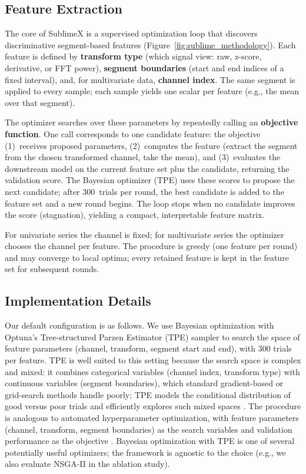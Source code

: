 \documentclass[times, review, 10pt]{elsarticle}
\begin{document}
\subsection{Feature Extraction}
The core of SublimeX is a supervised optimization loop that discovers discriminative
segment-based features (Figure~\ref{fig:sublime_methodology}).  Each feature is defined
by \textbf{transform type} (which signal view: raw, z-score, derivative, or FFT power),
\textbf{segment boundaries} (start and end indices of a fixed interval), and, for
multivariate data, \textbf{channel index}.  The same segment is applied to every
sample; each sample yields one scalar per feature (e.g., the mean over that segment).

The optimizer searches over these parameters by repeatedly calling an \textbf{objective
function}.  One call corresponds to one candidate feature: the objective (1)~receives
proposed parameters, (2)~computes the feature (extract the segment from the chosen
transformed channel, take the mean), and (3)~evaluates the downstream model on the
current feature set plus the candidate, returning the validation score.  The Bayesian
optimizer (TPE) uses these scores to propose the next candidate; after 300~trials per
round, the best candidate is added to the feature set and a new round begins.  The
loop stops when no candidate improves the score (stagnation), yielding a compact,
interpretable feature matrix.

For univariate series the channel is fixed; for multivariate series the optimizer
chooses the channel per feature.  The procedure is greedy (one feature per round) and
may converge to local optima; every retained feature is kept in the feature set for
subsequent rounds. 

\subsection{Implementation Details}
Our default configuration is as follows. We use Bayesian optimization with Optuna's Tree-structured Parzen Estimator (TPE)
sampler \cite{bergstra2011tpe, watanabe2023tpe} to search the space of feature
parameters (channel, transform, segment start and end), with 300 trials per feature.
TPE is well suited to this setting because the search space is complex and mixed: it combines categorical variables (channel index, transform type) with continuous variables (segment boundaries), which standard gradient-based or grid-search methods handle poorly; TPE models the conditional distribution of good versus poor trials and efficiently explores such mixed spaces \cite{bergstra2011tpe}.
The procedure is analogous to automated hyperparameter optimization, with feature parameters (channel, transform, segment boundaries) as the search variables and validation performance as the objective \cite{bergstra2011tpe}. Bayesian optimization with TPE is one of several potentially useful optimizers; the framework is agnostic to the choice (e.g., we also evaluate NSGA-II in the ablation study).
\end{document}
